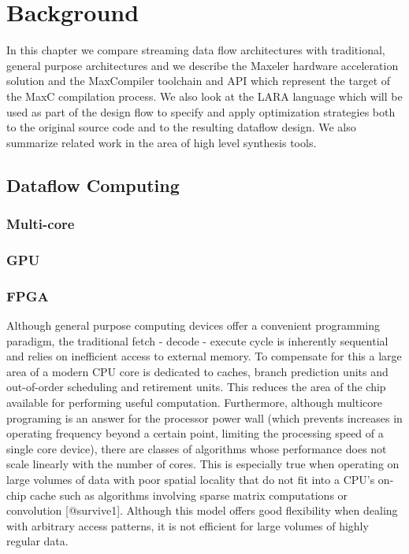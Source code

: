 \chapter{Background}

In this chapter we compare streaming data flow architectures with
traditional, general purpose architectures and we describe the Maxeler
hardware acceleration solution and the MaxCompiler toolchain and API
which represent the target of the MaxC compilation process. We also
look at the LARA language which will be used as part of the design
flow to specify and apply optimization strategies both to the original
source code and to the resulting dataflow design. We also summarize
related work in the area of high level synthesis tools.


\section{Dataflow Computing}

\subsection{Multi-core}

\subsection{GPU}

\subsection{FPGA}

Although general purpose computing devices offer a convenient
programming paradigm, the traditional fetch - decode - execute cycle
is inherently sequential and relies on inefficient access to external
memory. To compensate for this a large area of a modern CPU core is
dedicated to caches, branch prediction units and out-of-order
scheduling and retirement units. This reduces the area of the chip
available for performing useful computation. Furthermore, although
multicore programing is an answer for the processor power wall (which
prevents increases in operating frequency beyond a certain point,
limiting the processing speed of a single core device), there are
classes of algorithms whose performance does not scale linearly with
the number of cores. This is especially true when operating on large
volumes of data with poor spatial locality that do not fit into a
CPU's on-chip cache such as algorithms involving sparse matrix
computations or convolution [@survive1]. Although this model offers
good flexibility when dealing with arbitrary access patterns, it is
not efficient for large volumes of highly regular data.

